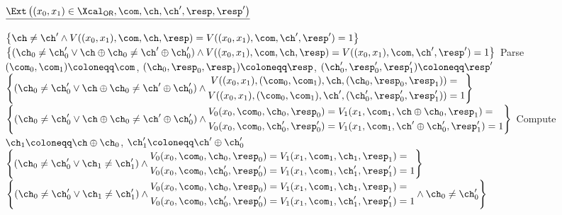 \begin{answer}
    \begin{simplebox}
        \small
        \noindent
        $\underline{\Ext\left((x_0, x_1) \in\Xcal_\mathsf{OR}, \com, \ch, \ch', \resp, \resp'\right)}$
        \begin{algorithmic}[1]
            \Statex $\left\{\ch\neq \ch'\land  V((x_0, x_1), \com, \ch, \resp)=V((x_0, x_1), \com, \ch', \resp')=1\right\}$ 
            \Statex $\left\{(\ch_0\neq \ch_0' \lor \ch\oplus \ch_0\neq \ch'\oplus \ch_0')\land  V((x_0, x_1), \com, \ch, \resp)=V((x_0, x_1), \com, \ch', \resp')=1\right\}$ 
            \State Parse $(\com_0, \com_1) \coloneqq \com$, $(\ch_0, \resp_0, \resp_1)\coloneqq \resp$, $(\ch_0', \resp_0', \resp_1')\coloneqq \resp'$
            \Statex $\left\{(\ch_0\neq \ch_0' \lor \ch\oplus \ch_0\neq \ch'\oplus \ch_0')\land  \begin{aligned}V((x_0, x_1), (\com_0, \com_1), \ch, (\ch_0, \resp_0, \resp_1))&=\\ V((x_0, x_1), (\com_0, \com_1), \ch', (\ch_0', \resp_0', \resp_1'))&=1\end{aligned}\right\}$
            \Statex $\left\{(\ch_0\neq \ch_0' \lor \ch\oplus \ch_0\neq \ch'\oplus \ch_0')\land  \begin{aligned} V_0(x_0, \com_0, \ch_0, \resp_0)&=V_1(x_1, \com_1, \ch\oplus \ch_0, \resp_1)=\\ V_0(x_0, \com_0, \ch_0', \resp_0')&=V_1(x_1, \com_1, \ch'\oplus \ch_0', \resp_1') =1\end{aligned}\right\}$ 
            \State Compute $\ch_1\coloneqq \ch\oplus \ch_0$, $\ch_1'\coloneqq \ch'\oplus \ch_0'$
            \Statex $\left\{(\ch_0\neq \ch_0' \lor \ch_1\neq \ch_1')\land  \begin{aligned} V_0(x_0, \com_0, \ch_0, \resp_0)&=V_1(x_1, \com_1, \ch_1, \resp_1)=\\ V_0(x_0, \com_0, \ch_0', \resp_0')&=V_1(x_1, \com_1, \ch_1', \resp_1') =1\end{aligned}\right\}$ 
                \Statex\hspace*{\algorithmicindent} $\left\{(\ch_0\neq \ch_0' \lor \ch_1\neq \ch_1')\land  \begin{aligned} V_0(x_0, \com_0, \ch_0, \resp_0)&=V_1(x_1, \com_1, \ch_1, \resp_1)=\\ V_0(x_0, \com_0, \ch_0', \resp_0')&=V_1(x_1, \com_1, \ch_1', \resp_1') =1\end{aligned} \land \ch_0\neq \ch_0'\right\}$ 

\end{algorithmic}
\end{simplebox}
\end{answer}
